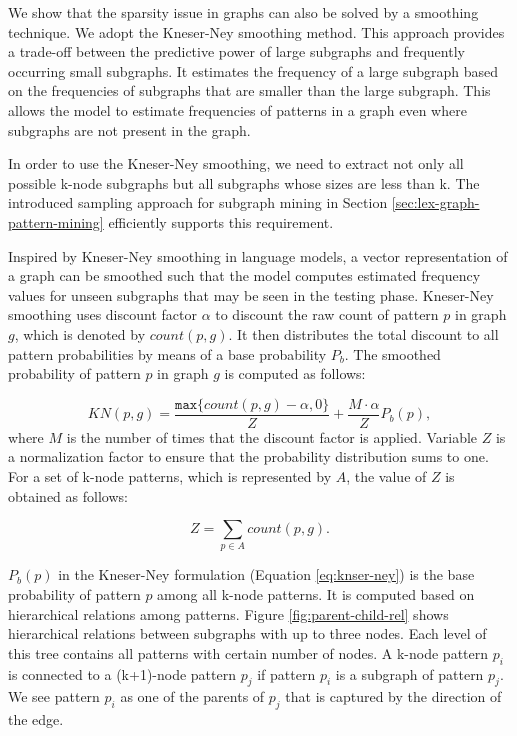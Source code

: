 We show that the sparsity issue in graphs can also be solved by a smoothing technique.  
We adopt the \mbox{Kneser-Ney} smoothing method.   
This approach provides a trade-off between the predictive power of large subgraphs and frequently occurring small subgraphs. 
It estimates the frequency of a large subgraph based on the frequencies of subgraphs that are smaller than the large subgraph. 
This allows the model to estimate frequencies of patterns in a graph even where subgraphs are not present in the graph. 

In order to use the Kneser-Ney smoothing, we need to extract not only all possible k-node subgraphs but all subgraphs whose sizes are less than k. 
The introduced sampling approach for subgraph mining in Section \ref{sec:lex-graph-pattern-mining} efficiently supports this requirement. 

Inspired by \mbox{Kneser-Ney} smoothing in language models, a vector representation of a graph can be smoothed such that the model computes estimated frequency values for unseen subgraphs that may be seen in the testing phase. 
\mbox{Kneser-Ney} smoothing uses discount factor $\alpha$ to discount the raw count of pattern $p$ in  graph $g$, which is denoted by $count(p,g)$. 
It then distributes the total discount to all pattern probabilities by means of a base probability $P_b$.
The smoothed probability of pattern $p$ in graph $g$ is computed as follows:

\begin{equation}
  \label{eq:knser-ney}
  KN(p,g) = \frac{\mathtt{max} \lbrace  count(p,g)-\alpha, 0 \rbrace }{Z} + \frac{M \cdot \alpha}{Z}P_b(p),
\end{equation}
where $M$ is the number of times that the discount factor is applied. 
Variable $Z$ is a normalization factor to ensure that the probability distribution sums to one.  
For a set of k-node patterns, which is represented by $A$, the value of $Z$ is obtained as follows:

\begin{equation}
Z = \sum_{p \in A} count(p,g). 
\end{equation}

$P_b(p)$ in the \mbox{Kneser-Ney} formulation (Equation \ref{eq:knser-ney}) is the base probability of pattern $p$ among all k-node patterns. 
It is computed based on hierarchical relations among patterns. 
Figure \ref{fig:parent-child-rel} shows hierarchical 
relations between subgraphs with up to three nodes. 
Each level of this tree contains all patterns with certain number of nodes. 
A k-node pattern $p_i$ is connected to a (k+1)-node pattern $p_j$ if pattern $p_i$ is a subgraph of pattern $p_j$. 
We see pattern $p_i$ as one of the parents of $p_j$ that is captured by the direction of the edge. 


